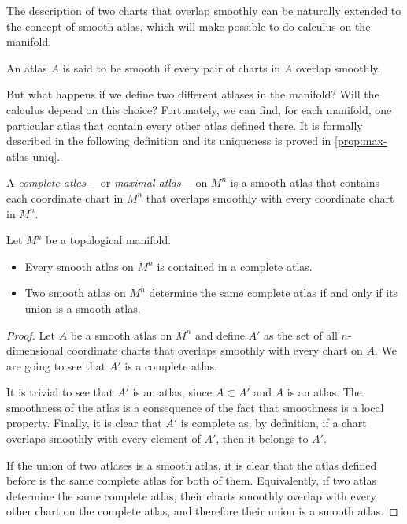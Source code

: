The description of two charts that overlap smoothly can be naturally extended to the concept of smooth atlas, which will make possible to do calculus on the manifold.

\begin{definition}
    An atlas $A$ is said to be smooth if every pair of charts in $A$ overlap smoothly.
\end{definition}

But what happens if we define two different atlases in the manifold? Will the calculus depend on this choice? Fortunately, we can find, for each manifold, one particular atlas that contain every other atlas defined there. It is formally described in the following definition and its uniqueness is proved in \autoref{prop:max-atlas-uniq}.

\begin{definition}
    A \emph{complete atlas} ---or \emph{maximal atlas}--- on $M^n$ is a smooth atlas that contains each coordinate chart in $M^n$ that overlaps smoothly with every coordinate chart in $M^n$.
\end{definition}

\begin{proposition}
    Let $M^n$ be a topological manifold.

    \begin{itemize}
        \item Every smooth atlas on $M^n$ is contained in a complete atlas.
        \item Two smooth atlas on $M^n$ determine the same complete atlas if and only if its union is a smooth atlas.
    \end{itemize}
    \label{prop:max-atlas-uniq}
\end{proposition}


\begin{proof}
 	Let $A$ be a smooth atlas on $M^n$ and define $A'$ as the set of all $n$-dimensional coordinate charts that overlaps smoothly with every chart on $A$. We are going to see that $A'$ is a complete atlas.
 	
 	It is trivial to see that $A'$ is an atlas, since $A \subset A'$ and $A$ is an atlas. The smoothness of the atlas is a consequence of the fact that smoothness is a local property. Finally, it is clear that $A'$ is complete as, by definition, if a chart overlaps smoothly with every element of $A'$, then it belongs to $A'$.
 	
 	If the union of two atlases is a smooth atlas, it is clear that the atlas defined before is the same complete atlas for both of them. Equivalently, if two atlas determine the same complete atlas, their charts smoothly overlap with every other chart on the complete atlas, and therefore their union is a smooth atlas.
\end{proof}

